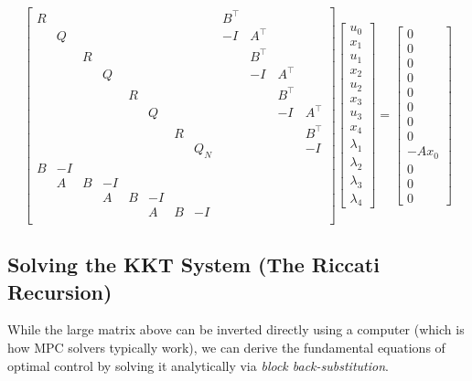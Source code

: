 \begin{equation*}
		\left[
		\begin{array}{cccccccc|cccc}
			R & & & & & & & & B^\top & & & \\
			& Q & & & & & & & -I & A^\top & & \\
			& & R & & & & & & & B^\top & & \\
			& & & Q & & & & & & -I & A^\top & \\
			& & & & R & & & & & & B^\top & \\
			& & & & & Q & & & & & -I & A^\top \\
			& & & & & & R & & & & & B^\top \\
			& & & & & & & Q_N & & & & -I \\
			\hline
			B & -I & & & & & & & & & & \\
			& A & B & -I & & & & & & & & \\
			& & & A & B & -I & & & & & & \\
			& & & &  & A & B & -I & & & & \\
		\end{array}
		\right]
		\begin{bmatrix} u_0 \\ x_1 \\ u_1 \\ x_2 \\ u_2 \\ x_3 \\ u_3 \\ x_4 \\ \hline \lambda_1 \\ \lambda_2 \\ \lambda_3 \\ \lambda_4 \end{bmatrix}
		=
		\begin{bmatrix} 0 \\ 0 \\ 0 \\ 0 \\ 0 \\ 0 \\ 0 \\ 0 \\ \hline -A x_0 \\ 0 \\ 0 \\ 0 \end{bmatrix}
\end{equation*}

\subsection{Solving the KKT System (The Riccati Recursion)}
While the large matrix above can be inverted directly using a computer (which is how MPC solvers typically work), we can derive the fundamental equations of optimal control by solving it analytically via \emph{block back-substitution}.

